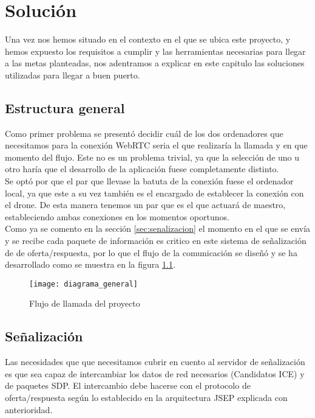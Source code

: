 \chapter{Solución}

Una vez nos hemos situado en el contexto en el que se ubica este proyecto, y hemos expuesto los requisitos a cumplir y las herramientas necesarias para llegar a las metas planteadas, nos adentramos a explicar en este capitulo las soluciones utilizadas para llegar a buen puerto.\\

\section{Estructura general}

Como primer problema se presentó decidir cuál de los dos ordenadores que necesitamos para la conexión WebRTC seria el que realizaría la llamada y en que momento del flujo. Este no es un problema trivial, ya que la selección de uno u otro haría que el desarrollo de la aplicación fuese completamente distinto.\\

Se optó por que el par que llevase la batuta de la conexión fuese el ordenador local, ya que este a su vez también es el encargado de  establecer la conexión con el drone. De esta manera tenemos un par que es el que actuará de maestro, estableciendo ambas conexiones en los momentos oportunos.\\

Como ya se comento en la sección \ref{sec:senalizacion} el momento en el que se envía y se recibe cada paquete de información es critico en este sistema de señalización de de oferta/respuesta, por lo que el flujo de la comunicación se diseñó y se ha desarrollado como se muestra en la figura \ref{fig:flujodellamada}.\\


\begin{figure}[htb]
\centering
\texttt{[image: diagrama\_general]}
\caption{Flujo de llamada del proyecto}
\label{fig:flujodellamada}
\end{figure}



\section{Señalización}

Las necesidades que que necesitamos cubrir en cuento al servidor de señalización es que sea capaz de intercambiar los datos de red necesarios (Candidatos ICE) y de paquetes SDP. El intercambio debe hacerse con el protocolo de oferta/respuesta según lo establecido en la arquitectura JSEP explicada con anterioridad.\\

